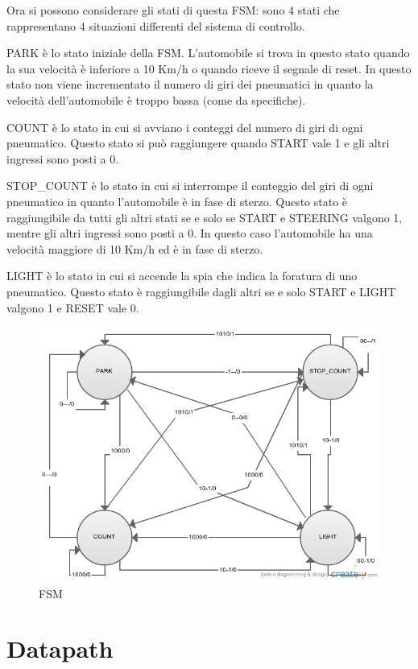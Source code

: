 \documentclass[a4paper,titlepage]{book}
\begin{document}
Ora si possono considerare gli stati di questa FSM: sono 4 stati che rappresentano 4 situazioni differenti del sistema di controllo.

PARK è lo stato iniziale della FSM. L'automobile si trova in questo stato quando la sua velocità è inferiore a 10 Km/h o quando riceve il segnale di reset. In questo stato non viene incrementato il numero di giri dei pneumatici in quanto la velocità dell'automobile è troppo bassa (come da specifiche).
 
COUNT è lo stato in cui si avviano i conteggi del numero di giri di ogni pneumatico. Questo stato si può raggiungere quando START vale 1 e gli altri ingressi sono posti a 0.

STOP\_COUNT è lo stato in cui si interrompe il conteggio del giri di ogni pneumatico in quanto l'automobile è in fase di sterzo. Questo stato è
raggiungibile da tutti gli altri stati se e solo se START e STEERING valgono 1, mentre gli altri ingressi sono posti a 0. In questo caso l'automobile ha una velocità maggiore di 10 Km/h ed è in fase di sterzo.

LIGHT è lo stato in cui si accende la spia che indica la foratura di uno pneumatico. Questo stato è raggiungibile dagli altri se e solo START e LIGHT valgono 1 e RESET vale 0.


\begin{figure}[!hb]
\centering
\includegraphics[scale=0.5]{schemi/fsm.png}
\caption{FSM}
\end{figure}



\chapter{Datapath}
\end{document}
